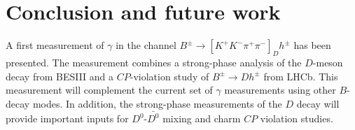 \documentclass[12pt, a4paper, notitlepage, onecolumn]{article}
\begin{document}
\section{Conclusion and future work}
\noindent A first measurement of $\gamma$ in the channel $B^\pm\to[K^+K^-\pi^+\pi^-]_Dh^\pm$ has been presented. The measurement combines a strong-phase analysis of the $D$-meson decay from BESIII and a $C\!P$-violation study of $B^\pm\to Dh^\pm$ from LHCb. This measurement will complement the current set of $\gamma$ measurements using other $B$-decay modes. In addition, the strong-phase measurements of the $D$ decay will provide important inputs for $D^0$-$\bar{D^0}$ mixing and charm $C\!P$ violation studies.


%

\end{document}
